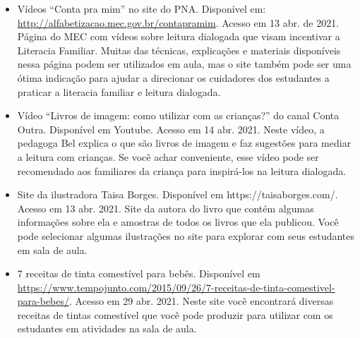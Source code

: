 \documentclass[11pt]{extarticle}
\begin{document}
\begin{itemize}
\item Vídeos “Conta pra mim” no site do PNA. Disponível em: \url{http://alfabetizacao.mec.gov.br/contapramim}. 
Acesso em 13 abr. de 2021.
Página do MEC com vídeos sobre leitura dialogada que visam incentivar a Literacia Familiar. Muitas das 
técnicas, explicações e materiais disponíveis nessa página podem ser utilizados em aula, mas o site também 
pode ser uma ótima indicação para ajudar a direcionar os cuidadores dos estudantes a praticar 
a literacia familiar e leitura dialogada.

\item Vídeo “Livros de imagem: como utilizar com as crianças?” do canal Conta Outra. Disponível em Youtube. 
Acesso em 14 abr. 2021. 
Neste vídeo, a pedagoga Bel explica o que são livros de imagem e faz sugestões para mediar a leitura com 
crianças. Se você achar conveniente, esse vídeo pode ser recomendado aos familiares da criança 
para inspirá-los na leitura dialogada. 

\item Site da ilustradora Taisa Borges. Disponível em https://taisaborges.com/. Acesso em 13 abr. 2021. 
Site da autora do livro que contém algumas informações sobre ela e amostras de todos os livros que ela publicou. 
Você pode selecionar algumas ilustrações no site para explorar com seus estudantes em sala de aula. 

\item 7 receitas de tinta comestível para bebês. 
Disponível em \url{https://www.tempojunto.com/2015/09/26/7-receitas-de-tinta-comestivel-para-bebes/}. 
Acesso em 29 abr. 2021. 
Neste site você encontrará diversas receitas de tintas comestível que você pode produzir 
para utilizar com os estudantes em atividades na sala de aula. 
\end{itemize}
\end{document}

